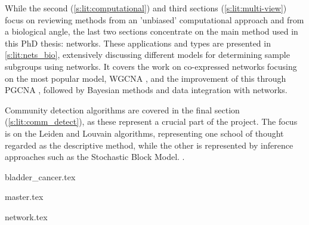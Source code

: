 While the second (\cref{s:lit:computational}) and third sections (\cref{s:lit:multi-view}) focus on reviewing methods from an 'unbiased' computational approach and from a biological angle, the last two sections concentrate on the main method used in this PhD thesis: networks. These applications and types are presented in \cref{s:lit:nets_bio}, extensively discussing different models for determining sample subgroups using networks. It covers the work on co-expressed networks focusing on the most popular model, WGCNA \cite{Langfelder2008-sn}, and the improvement of this through PGCNA \cite{Care2019-ij}, followed by Bayesian methods and data integration with networks.

Community detection algorithms are covered in the final section (\cref{s:lit:comm_detect}), as these represent a crucial part of the project. The focus is on the Leiden and Louvain algorithms, representing one school of thought regarded as the descriptive method, while the other is represented by inference approaches such as the Stochastic Block Model.
.

{bladder_cancer.tex}

\pagebreak

{master.tex}

\pagebreak

{network.tex}



